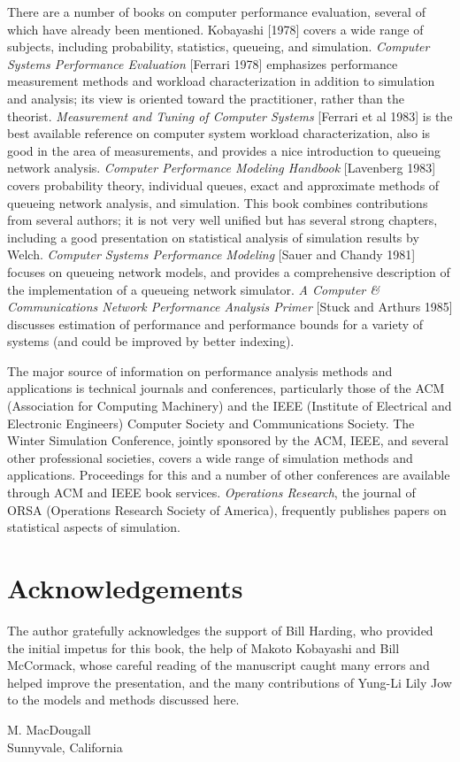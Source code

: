 There are a number of books on computer performance evaluation, several of
which have already been mentioned. Kobayashi [1978] covers a wide range of
subjects, including probability, statistics, queueing, and simulation.
\textit{Computer Systems Performance Evaluation} [Ferrari 1978] emphasizes performance
measurement methods and workload characterization in addition to simulation and
analysis; its view is oriented toward the practitioner, rather than the
theorist. \textit{Measurement and Tuning of Computer Systems} [Ferrari et al 1983] is
the best available reference on computer system workload characterization, also
is good in the area of measurements, and provides a nice introduction to
queueing network analysis. \textit{Computer Performance Modeling Handbook}
[Lavenberg 1983] covers probability theory, individual queues, exact and
approximate methods of queueing network analysis, and simulation. This book
combines contributions from several authors; it is
not very well unified but has several strong chapters, including a good
presentation on statistical analysis of simulation results by Welch. \textit{Computer
Systems Performance Modeling} [Sauer and Chandy 1981] focuses on queueing
network models, and provides a comprehensive description of the implementation
of a queueing network simulator. \textit{A Computer
\& Communications Network Performance Analysis Primer} [Stuck and Arthurs 1985]
discusses estimation of performance and performance bounds for a variety of
systems (and could be improved by better indexing).

The major source of information on performance analysis methods and
applications is technical journals and conferences, particularly those of the
ACM (Association for Computing Machinery) and the IEEE (Institute of Electrical
and Electronic Engineers) Computer Society and Communications Society. The
Winter Simulation Conference, jointly sponsored by the ACM, IEEE, and several
other professional societies, covers a wide range of simulation methods and
applications. Proceedings for this and a number of other conferences are
available through ACM and IEEE book services. \textit{Operations Research}, the journal
of ORSA (Operations Research Society of America), frequently publishes papers
on statistical aspects of simulation.

\section*{Acknowledgements}

The author gratefully acknowledges the support of Bill Harding, who provided
the initial impetus for this book, the help of Makoto Kobayashi and Bill
McCormack, whose careful reading of the manuscript caught many errors and
helped improve the presentation, and the many contributions of Yung-Li Lily
Jow to the models and methods discussed here.

M. MacDougall\\
Sunnyvale, California
